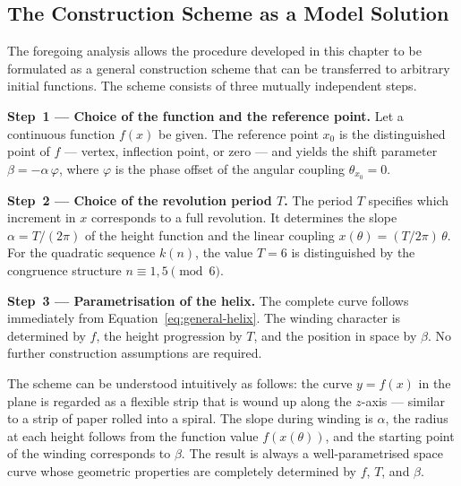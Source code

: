 \subsection{The Construction Scheme as a Model Solution}

The foregoing analysis allows the procedure developed in this chapter to
be formulated as a general construction scheme that can be transferred to
arbitrary initial functions. The scheme consists of three mutually
independent steps.

\textbf{Step~1 --- Choice of the function and the reference point.}
Let a continuous function $f(x)$ be given. The reference point $x_0$ is
the distinguished point of $f$ --- vertex, inflection point, or zero ---
and yields the shift parameter
$\beta = -\alpha\,\varphi$, where $\varphi$ is the phase offset of the
angular coupling $\theta_{x_0} = 0$.

\textbf{Step~2 --- Choice of the revolution period $T$.}
The period $T$ specifies which increment in $x$ corresponds to a full
revolution. It determines the slope $\alpha = T/(2\pi)$ of the height
function and the linear coupling
$x(\theta) = (T/2\pi)\,\theta$. For the quadratic sequence $k(n)$, the
value $T = 6$ is distinguished by the congruence structure
$n \equiv 1, 5 \pmod{6}$.

\textbf{Step~3 --- Parametrisation of the helix.}
The complete curve follows immediately from
Equation~\eqref{eq:general-helix}. The winding character is determined
by $f$, the height progression by $T$, and the position in space by
$\beta$. No further construction assumptions are required.

\begin{remark}\label{rem:geometric-intuition}
The scheme can be understood intuitively as follows: the curve $y = f(x)$
in the plane is regarded as a flexible strip that is wound up along the
$z$-axis --- similar to a strip of paper rolled into a spiral. The slope
during winding is $\alpha$, the radius at each height follows from the
function value $f(x(\theta))$, and the starting point of the winding
corresponds to $\beta$. The result is always a well-parametrised space
curve whose geometric properties are completely determined by $f$, $T$,
and $\beta$.
\end{remark}
